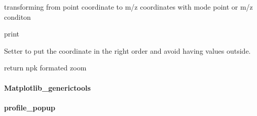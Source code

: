\documentclass[letterpaper,10pt,openany,oneside]{sphinxmanual}
\begin{document}
\begin{fulllineitems}
\begin{fulllineitems}
\end{fulllineitems}


\begin{fulllineitems}
\label{rst/visu2d:Visu.convert.CONVERT.pass_to_pt}
transforming from point coordinate to m/z coordinates with mode point or m/z conditon

\end{fulllineitems}


\begin{fulllineitems}
\label{rst/visu2d:Visu.convert.CONVERT.pr}
print

\end{fulllineitems}


\begin{fulllineitems}
\label{rst/visu2d:Visu.convert.CONVERT.set}
Setter to put the coordinate in the right order and avoid having values outside.

\end{fulllineitems}


\begin{fulllineitems}
\label{rst/visu2d:Visu.convert.CONVERT.to_npk}
return npk formated zoom

\end{fulllineitems}


\end{fulllineitems}



\paragraph{Matplotlib\_generictools}
\label{rst/visu2d:module-Visu.Matplotlib_generictools}\label{rst/visu2d:matplotlib-generictools}

\paragraph{profile\_popup}
\label{rst/visu2d:module-Visu.profile_popup}\label{rst/visu2d:profile-popup}
\end{document}
